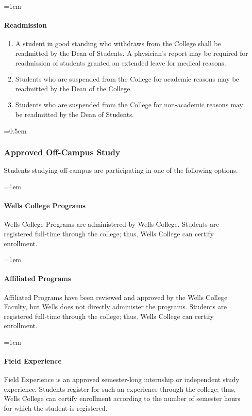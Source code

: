 \documentclass{manual}
\let\oldsubsubsection\subsubsection
\renewcommand\subsubsection{\leftskip=0.5em\oldsubsubsection}
\let\oldparagraph\paragraph
\renewcommand\paragraph{\leftskip=1em\oldparagraph}
\begin{document}
			\paragraph{Readmission}

				\begin{enumerate}[label=\alph*)]
				\item A student in good standing who withdraws from the College shall be readmitted by the Dean of Students. A physician's report may be required for readmission of students granted an extended leave for medical reasons.
				\item Students who are suspended from the College for academic reasons may be readmitted by the Dean of the College.
				\item Students who are suspended from the College for non-academic reasons may be readmitted by the Dean of Students.
				\end{enumerate}

		\subsubsection{Approved Off-Campus Study}
		Students studying off-campus are participating in one of the following options.

			\paragraph{Wells College Programs}
			Wells College Programs are administered by Wells College. Students are registered full-time through the college; thus, Wells College can certify enrollment.

			\paragraph{Affiliated Programs}
			Affiliated Programs have been reviewed and approved by the Wells College Faculty, but Wells does not directly administer the programs. Students are registered full-time through the college; thus, Wells College can certify enrollment.

			\paragraph{Field Experience}
			Field Experience is an approved semester-long internship or independent study experience. Students register for such an experience through the college; thus, Wells College can certify enrollment according to the number of semester hours for which the student is registered.
\end{document}

